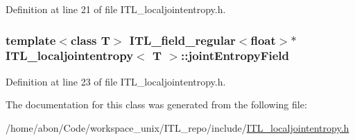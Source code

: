 Definition at line 21 of file ITL\_\-localjointentropy.h.

\hypertarget{classITL__localjointentropy_a374226ab54b6d5cf039a4d8ed99bc07f}{
\subsubsection[{jointEntropyField}]{\setlength{\rightskip}{0pt plus 5cm}template$<$class T$>$ {\bf ITL\_\-field\_\-regular}$<$float$>$$\ast$ {\bf ITL\_\-localjointentropy}$<$ T $>$::{\bf jointEntropyField}}}
\label{classITL__localjointentropy_a374226ab54b6d5cf039a4d8ed99bc07f}


Definition at line 23 of file ITL\_\-localjointentropy.h.



The documentation for this class was generated from the following file:\begin{DoxyCompactItemize}
\item 
/home/abon/Code/workspace\_\-unix/ITL\_\-repo/include/\hyperlink{ITL__localjointentropy_8h}{ITL\_\-localjointentropy.h}\end{DoxyCompactItemize}
